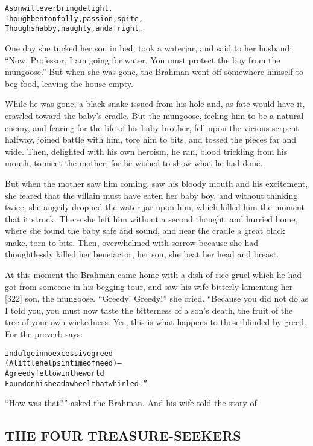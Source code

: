 \documentclass{article}
\renewenvironment{verbatim}{\begin{alltt}\normalfont\begin{centering}}{\end{centering}\end{alltt}}
\begin{document}
\begin{verbatim}
A son will ever bring delight.
Though bent on folly, passion, spite,
Though shabby, naughty, and a fright.
\end{verbatim}
One day she tucked her son in bed, took a waterjar, and said to her
husband:
``Now, Professor, I am going for water. You must protect the boy from the mungoose.''
But when she was gone, the Brahman went off somewhere himself to
beg food, leaving the house empty.

While he was gone, a black snake issued from his hole and, as fate
would have it, crawled toward the baby's cradle. But the mungoose,
feeling him to be a natural enemy, and fearing for the life of his
baby brother, fell upon the vicious serpent halfway, joined battle
with him, tore him to bits, and tossed the pieces far and wide.
Then, delighted with his own heroism, he ran, blood trickling from
his mouth, to meet the mother; for he wished to show what he had
done.

But when the mother saw him coming, saw his bloody mouth and his
excitement, she feared that the villain must have eaten her baby
boy, and without thinking twice, she angrily dropped the water-jar
upon him, which killed him the moment that it struck. There she
left him without a second thought, and hurried home, where she
found the baby safe and sound, and near the cradle a great black
snake, torn to bits. Then, overwhelmed with sorrow because she had
thoughtlessly killed her benefactor, her son, she beat her head and
breast.

At this moment the Brahman came home with a dish of rice gruel
which he had got from someone in his begging tour, and saw his wife
bitterly lamenting her [322] son, the mungoose. ``Greedy! Greedy!''
she cried. “Because you did not do as I told you, you must now
taste the bitterness of a son's death, the fruit of the tree of
your own wickedness. Yes, this is what happens to those blinded by
greed. For the proverb says:

\begin{verbatim}
Indulge in no excessive greed
(A little helps in time of need)--
A greedy fellow in the world
Found on his head a wheel that whirled.”
\end{verbatim}
``How was that?'' asked the Brahman. And his wife told the story
of

\subsection{THE FOUR TREASURE-SEEKERS}
\end{document}
